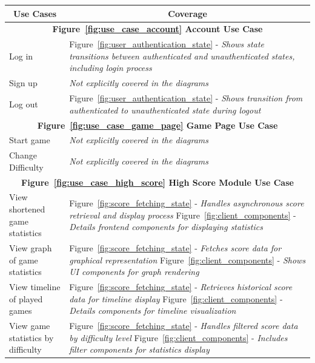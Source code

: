 \documentclass[11pt,a4paper]{article}
\begin{document}
\begin{table}
\begin{tabular}{|p{}|p{}|}
\hline
\multicolumn{1}{|c|}{\textbf{Use Cases}}    & \multicolumn{1}{|c|}{\textbf{Coverage}}                   \\ \hline
\multicolumn{2}{|c|}{\textbf {Figure~\ref{fig:use_case_account} Account Use Case} }                                          \\ \hline
Log in& Figure~\ref{fig:user_authentication_state} - \textit{Shows state transitions between authenticated and unauthenticated states, including login process}\\
\hline
Sign up& \textit{Not explicitly covered in the diagrams}\\
\hline
Log out& Figure~\ref{fig:user_authentication_state} - \textit{Shows transition from authenticated to unauthenticated state during logout}\\
\hline
\multicolumn{2}{|c|}{\textbf {Figure~\ref{fig:use_case_game_page} Game Page Use Case} }                                      \\
\hline
Start game& \textit{Not explicitly covered in the diagrams}\\
\hline
Change Difficulty& \textit{Not explicitly covered in the diagrams}\\
\hline
\multicolumn{2}{|c|}{\textbf {Figure~\ref{fig:use_case_high_score} High Score Module Use Case} }                                         \\
\hline
View shortened game statistics& Figure~\ref{fig:score_fetching_state} - \textit{Handles asynchronous score retrieval and display process}\newline 
Figure~\ref{fig:client_components} - \textit{Details frontend components for displaying statistics} \\
\hline
View graph of game statistics& Figure~\ref{fig:score_fetching_state} - \textit{Fetches score data for graphical representation}\newline
Figure~\ref{fig:client_components} - \textit{Shows UI components for graph rendering} \\
\hline
View timeline of played games& Figure~\ref{fig:score_fetching_state} - \textit{Retrieves historical score data for timeline display}\newline
Figure~\ref{fig:client_components} - \textit{Details components for timeline visualization} \\
\hline
View game statistics by difficulty& Figure~\ref{fig:score_fetching_state} - \textit{Handles filtered score data by difficulty level}\newline
Figure~\ref{fig:client_components} - \textit{Includes filter components for statistics display} \\
\hline
\end{tabular}
\end{table}
\end{document}
